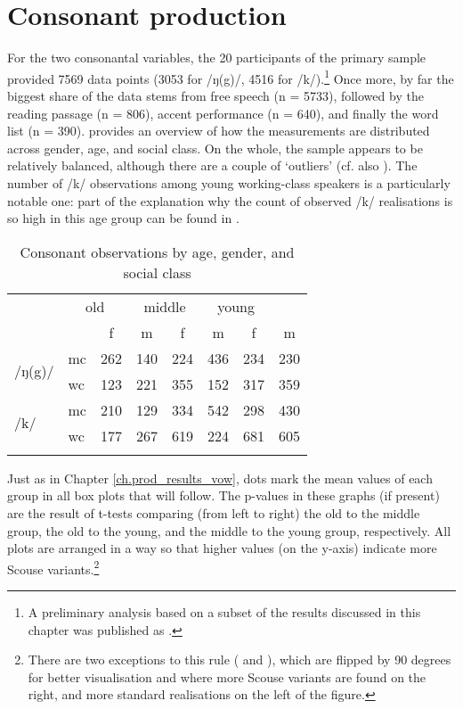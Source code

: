 \chapter{Consonant production}
\label{prod.res.con}

For the two consonantal variables, the 20 participants of the primary sample provided 7569 data points (3053 for /ŋ(g)/, 4516 for /k/).\footnote{A preliminary analysis based on a subset of the results discussed in this chapter was published as \citealt{juskanaccentrevivallipp}.}
Once more, by far the biggest share of the data stems from free speech (n = 5733), followed by the reading passage (n = 806), accent performance (n = 640), and finally the word list (n = 390).
 provides an overview of how the measurements are distributed across gender, age, and social class.
On the whole, the sample appears to be relatively balanced, although there are a couple of `outliers' (cf. also ).
The number of /k/ observations among young working-class speakers is a particularly notable one: part of the explanation why the count of observed /k/ realisations is so high in this age group can be found in .

\begin{table}
	
	\caption{Consonant observations by age, gender, and social class}
	\label{tab.consonants.n.observations}
	\begin{tabular}{llcccccc}
		\lsptoprule
		\multicolumn{2}{c}{} & \multicolumn{2}{c}{old} & \multicolumn{2}{c}{middle} & \multicolumn{2}{c}{young}\\
		& & f & m & f & m & f & m\\
		\midrule
		\multirow{2}{*}{/ŋ(g)/} & mc & 262 & 140 & 224 & 436 & 234 & 230\\
		& wc & 123 & 221 & 355 & 152 & 317 & 359\\
		\multirow{2}{*}{/k/} & mc & 210 & 129 & 334 & 542 & 298 & 430\\
		& wc & 177 & 267 & 619 & 224 & 681 & 605\\
		\lspbottomrule
	\end{tabular}
\end{table}

Just as in Chapter \ref{ch.prod_results_vow}, dots mark the mean values of each group in all box plots that will follow.
The p-values in these graphs (if present) are the result of t-tests comparing (from left to right) the old to the middle group, the old to the young, and the middle to the young group, respectively.
All plots are arranged in a way so that higher values (on the y-axis) indicate more Scouse variants.\footnote{There are two exceptions to this rule ( and ), which are flipped by 90 degrees for better visualisation and where more Scouse variants are found on the right, and more standard realisations on the left of the figure.}


